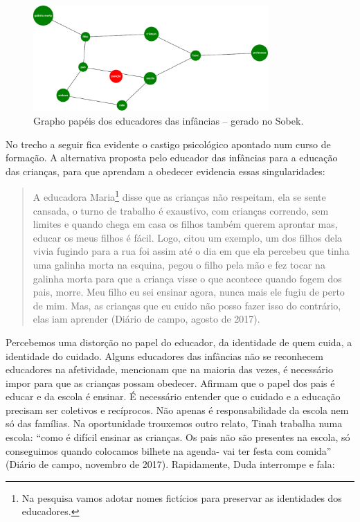 \documentclass{textolivre-html}
\begin{document}
\begin{figure}[h!]
 \centering
 \includegraphics[width=0.8\textwidth]{figure08.pdf}
 \caption{Grapho papéis dos educadores das infâncias -- gerado no Sobek.}
 \label{fig-fig08}
\end{figure}


No trecho a seguir fica evidente o castigo psicológico apontado num curso de formação. A alternativa proposta pelo educador das infâncias para a educação das crianças, para que aprendam a obedecer evidencia essas singularidades:

\begin{quote}
A educadora Maria\footnote{Na pesquisa vamos adotar nomes fictícios para preservar as identidades dos educadores.} disse que as crianças não respeitam, ela se sente cansada, o turno de trabalho é exaustivo, com crianças correndo, sem limites e quando chega em casa os filhos também querem aprontar mas, educar os meus filhos é fácil. Logo, citou um exemplo, um dos filhos dela vivia fugindo para a rua foi assim até o dia em que ela percebeu que tinha uma galinha morta na esquina, pegou o filho pela mão e fez tocar na galinha morta para que a criança visse o que acontece quando fogem dos pais, morre. Meu filho eu sei ensinar agora, nunca mais ele fugiu de perto de mim. Mas, as crianças que eu cuido não posso fazer isso do contrário, elas iam aprender (Diário de campo, agosto de 2017). 
\end{quote}

Percebemos uma distorção no papel do educador, da identidade de quem cuida, a identidade do cuidado. Alguns educadores das infâncias não se reconhecem educadores na afetividade, mencionam que na maioria das vezes, é necessário impor para que as crianças possam obedecer. Afirmam que o papel dos pais é educar e da escola é ensinar. É necessário entender que o cuidado e a educação precisam ser coletivos e recíprocos. Não apenas é responsabilidade da escola nem só das famílias. Na oportunidade trouxemos outro relato, Tinah trabalha numa escola: “como é difícil ensinar as crianças. Os pais não são presentes na escola, só conseguimos quando colocamos bilhete na agenda- vai ter festa com comida” (Diário de campo, novembro de 2017). Rapidamente, Duda interrompe e fala:
\end{document}
